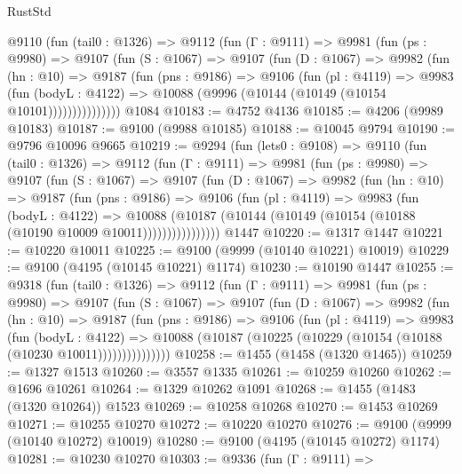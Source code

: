 \begin{lexlean}{RustStd}
\begin{coremodule}
      @9110
        (fun (tail0 : @1326) =>
        @9112
          (fun (Γ : @9111) =>
          @9981
            (fun (ps : @9980) =>
            @9107
              (fun (S : @1067) =>
              @9107
                (fun (D : @1067) =>
                @9982
                  (fun (hn : @10) =>
                  @9187
                    (fun (pns : @9186) =>
                    @9106
                      (fun (pl : @4119) =>
                      @9983
                        (fun (bodyL : @4122) =>
                        @10088 (@9996 (@10144 (@10149 (@10154 @10101)))))))))))))))
    @1084
@10183 := @4752 @4136
@10185 := @4206 (@9989 @10183)
@10187 := @9100 (@9988 @10185)
@10188 := @10045 @9794
@10190 := @9796 @10096 @9665
@10219 := @9294
    (fun (lets0 : @9108) =>
    @9110
      (fun (tail0 : @1326) =>
      @9112
        (fun (Γ : @9111) =>
        @9981
          (fun (ps : @9980) =>
          @9107
            (fun (S : @1067) =>
            @9107
              (fun (D : @1067) =>
              @9982
                (fun (hn : @10) =>
                @9187
                  (fun (pns : @9186) =>
                  @9106
                    (fun (pl : @4119) =>
                    @9983
                      (fun (bodyL : @4122) =>
                      @10088
                        (@10187
                          (@10144 (@10149 (@10154 (@10188 (@10190 @10009 @10011))))))))))))))))
    @1447
@10220 := @1317 @1447
@10221 := @10220 @10011
@10225 := @9100 (@9999 (@10140 @10221) @10019)
@10229 := @9100 (@4195 (@10145 @10221) @1174)
@10230 := @10190 @1447
@10255 := @9318
    (fun (tail0 : @1326) =>
    @9112
      (fun (Γ : @9111) =>
      @9981
        (fun (ps : @9980) =>
        @9107
          (fun (S : @1067) =>
          @9107
            (fun (D : @1067) =>
            @9982
              (fun (hn : @10) =>
              @9187
                (fun (pns : @9186) =>
                @9106
                  (fun (pl : @4119) =>
                  @9983
                    (fun (bodyL : @4122) =>
                    @10088 (@10187 (@10225 (@10229 (@10154 (@10188 (@10230 @10011)))))))))))))))
@10258 := @1455 (@1458 (@1320 @1465))
@10259 := @1327 @1513
@10260 := @3557 @1335
@10261 := @10259 @10260
@10262 := @1696 @10261
@10264 := @1329 @10262 @1091
@10268 := @1455 (@1483 (@1320 @10264)) @1523
@10269 := @10258 @10268
@10270 := @1453 @10269
@10271 := @10255 @10270
@10272 := @10220 @10270
@10276 := @9100 (@9999 (@10140 @10272) @10019)
@10280 := @9100 (@4195 (@10145 @10272) @1174)
@10281 := @10230 @10270
@10303 := @9336
    (fun (Γ : @9111) =>

\end{coremodule}
\end{lexlean}
